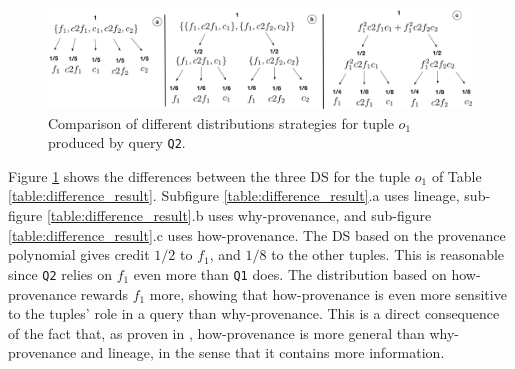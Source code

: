 \begin{figure}[]
  \includegraphics[width=\textwidth]{figures/how_distribution}
  \caption{Comparison of different distributions strategies for tuple $o_1$ produced by query \texttt{Q2}.}
  \label{figure:distributions_differences}
\end{figure}


Figure \ref{figure:distributions_differences} shows the differences between the three DS for the tuple $o_1$ of Table \ref{table:difference_result}. Subfigure \ref{table:difference_result}.a uses lineage, sub-figure \ref{table:difference_result}.b uses why-provenance, and sub-figure \ref{table:difference_result}.c uses how-provenance. 
The DS based on the provenance polynomial gives credit $1/2$ to $f_1$, and $1/8$ to the other tuples.
This is reasonable since \texttt{Q2} relies on $f_1$ even more than \texttt{Q1} does. 
The distribution based on how-provenance rewards $f_1$ more, showing that how-provenance is even more sensitive to the tuples' role in a query than why-provenance. %
This is a direct consequence of the fact that, as proven in \citep{howProvenanceGreen}, how-provenance is more general than why-provenance and lineage, in the sense that it contains more information. 



